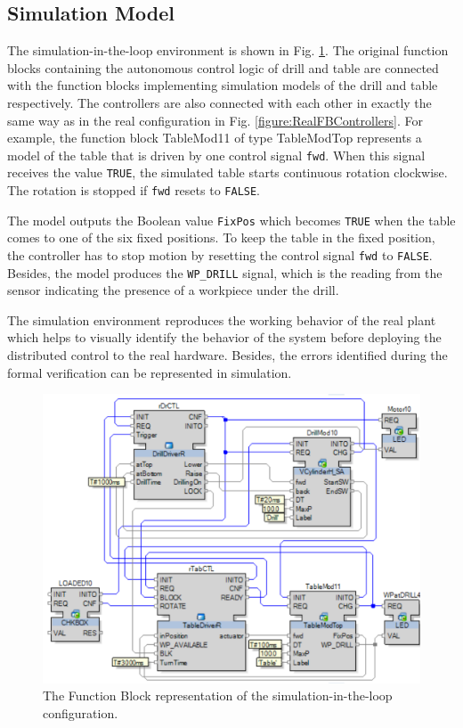 \begin{bibunit}
\section{Simulation Model}\label{sec:simulation_model}

The simulation-in-the-loop environment is shown in Fig. \ref{figure:SimulationFBDiagram}. The original function blocks containing the autonomous control logic of drill and table are connected with the function blocks implementing simulation models of the drill and table respectively. The controllers are also connected with each other in exactly the same way as in the real configuration in Fig. \ref{figure:RealFBControllers}. 
For example, the function block TableMod11 of type TableModTop represents a model of the table that is driven by one control signal \texttt{fwd}. When this signal receives the value \texttt{TRUE}, the simulated table starts continuous rotation clockwise. The rotation is stopped if \texttt{fwd} resets to \texttt{FALSE}.

The model outputs the Boolean value \texttt{FixPos} which becomes \texttt{TRUE} when the table comes to one of the six fixed positions. To keep the table in the fixed position, the controller has to stop motion by resetting the control signal \texttt{fwd} to \texttt{FALSE}. Besides, the model produces the \texttt{WP\_DRILL} signal, which is the reading from the sensor indicating the presence of a workpiece under the drill.

The simulation environment reproduces the working behavior of the real plant which helps to visually identify the behavior of the system before deploying the distributed control to the real hardware. Besides, the errors identified during the formal verification can be represented in simulation. 

\begin{figure}[h]
    \centering
    \includegraphics[scale = 0.3]{MX_Papers/Paper2/images/SimulationFBsystem.png}
    \caption{The Function Block representation of the simulation-in-the-loop configuration.}
    \label{figure:SimulationFBDiagram}
\end{figure} 


\end{bibunit}
